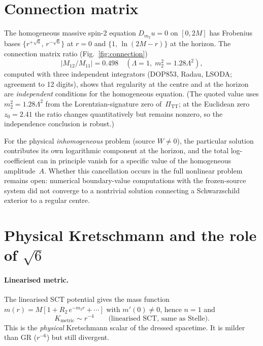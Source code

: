 \documentclass[a4paper,12pt]{article}
\newcommand{\Lam}{\Lambda}
\newcommand{\PiTT}{\Pi_{\mathrm{TT}}}
\begin{document}
\section{Connection matrix}\label{sec:connection}

The homogeneous massive spin-2 equation $D_{m_2}u=0$ on $[0,2M]$
has Frobenius bases
$\{r^{+\sqrt{6}},\,r^{-\sqrt{6}}\}$ at $r=0$ and
$\{1,\,\ln(2M\!-\!r)\}$ at the horizon.
The connection matrix ratio (Fig.~\ref{fig:connection})
\begin{equation}
  |M_{12}/M_{11}| = 0.498 \quad(\Lam=1,\;m_2^2=1.28\Lam^2),
\end{equation}
computed with three independent integrators (DOP853, Radau, LSODA;
agreement to 12 digits), shows that regularity at the centre and at
the horizon are \emph{independent} conditions for the homogeneous
equation.
(The quoted value uses $m_2^2=1.28\Lam^2$ from the Lorentzian-signature
zero of~$\PiTT$; at the Euclidean zero $z_0=2.41$ the ratio changes
quantitatively but remains nonzero, so the independence conclusion
is robust.)

For the physical \emph{inhomogeneous} problem (source $W\neq 0$),
the particular solution contributes its own logarithmic component at
the horizon, and the total log-coefficient can in principle vanish
for a specific value of the homogeneous amplitude~$A$.
Whether this cancellation occurs in the full nonlinear problem remains
open: numerical boundary-value computations with the frozen-source
system did not converge to a nontrivial solution connecting a
Schwarzschild exterior to a regular centre.

\section{Physical Kretschmann and the role of $\sqrt{6}$}
\label{sec:physical}

\paragraph{Linearised metric.}
The linearised SCT potential gives the mass function
$m(r)=M[1+R_2\,e^{-m_2 r}+\cdots]$ with $m'(0)\neq 0$, hence $n=1$ and
\begin{equation}\label{eq:Kmetric}
  K_{\mathrm{metric}}\sim r^{-4}\qquad\text{(linearised SCT, same as Stelle)}.
\end{equation}
This is the \emph{physical} Kretschmann scalar of the dressed spacetime.
It is milder than GR ($r^{-6}$) but still divergent.
\end{document}
